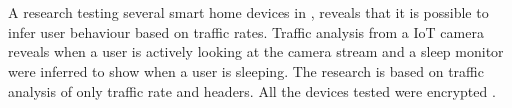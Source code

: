\\\\
A research testing several smart home devices in \cite{SpyingonSmartHomes}, reveals that it is possible to infer user behaviour based on traffic rates. Traffic analysis from a IoT camera reveals when a user is actively looking at the camera stream and a sleep monitor were inferred to show when a user is sleeping. The research is based on traffic analysis of only traffic rate and headers. All the devices tested were encrypted \cite{SpyingonSmartHomes}.
\\\\
